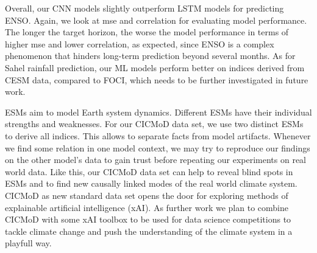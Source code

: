 \documentclass{CUP-JNL-DTM}%
\theoremstyle{definition}
\numberwithin{equation}{section}
\begin{document}
Overall, our CNN models slightly outperform LSTM models for predicting ENSO. Again, we look at mse and correlation for evaluating model performance. The longer the target horizon, the worse the model performance in terms of higher mse and lower correlation, as expected, since ENSO is a complex phenomenon that hinders long-term prediction beyond several months. As for Sahel rainfall prediction, our ML models perform better on indices derived from CESM data, compared to FOCI, which needs to be further investigated in future work.

ESMs aim to model Earth system dynamics. Different ESMs have their individual strengths and weaknesses. For our CICMoD data set, we use two distinct ESMs to derive all indices. This allows to separate facts from model artifacts. Whenever we find some relation in one model context, we may try to reproduce our findings on the other model's data to gain trust before repeating our experiments on real world data. Like this, our CICMoD data set can help to reveal blind spots in ESMs and to find new causally linked modes of the real world climate system. CICMoD as new standard data set opens the door for exploring methods of explainable artificial intelligence (xAI). As further work we plan to combine CICMoD with some xAI toolbox to be used for data science competitions to tackle climate change and push the understanding of the climate system in a playfull way.
\end{document}
